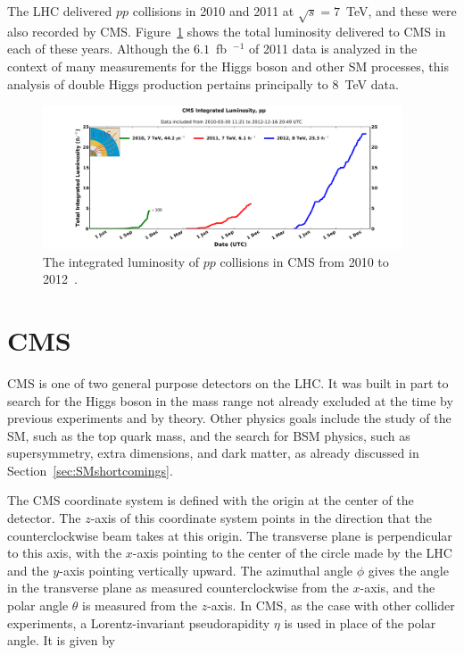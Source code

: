 The LHC delivered $pp$ collisions in 2010 and 2011 at $\sqrt{s} = 7$~TeV,
and these were also recorded by CMS.
Figure~\ref{fig:intlumi101112} shows the total luminosity delivered to CMS in each of these years.
Although the $6.1$~fb~$^{-1}$ of 2011 data is analyzed in the context of
many measurements for the Higgs boson and
other SM processes, this analysis of double Higgs production pertains principally to 8~TeV data.

\begin{figure}[htbp!]
 \begin{center}
    \includegraphics[width=0.95\textwidth]{figures/experiment/int_lumi_cumulative_pp_1.pdf}
      \end{center}
\caption{The integrated luminosity of $pp$ collisions in CMS from 2010 to 2012~\cite{CMS:lumi}.}
\label{fig:intlumi101112}
\end{figure}


\section{CMS\label{sec:CMS}}

CMS is one of two general purpose detectors on the LHC. It was built in part
to search for the Higgs boson in the mass range not already excluded
at the time by previous experiments
and by theory. Other physics goals include
the study of the SM, such as the top quark mass, and the search for BSM physics, such
as supersymmetry, extra dimensions, and dark matter, as already discussed in
Section~\ref{sec:SMshortcomings}.

The CMS coordinate system is defined with the origin at the center of the detector. The $z$-axis
of this coordinate system points in the direction that the counterclockwise beam takes at this origin.
The transverse plane is perpendicular to this axis, with the $x$-axis pointing to the center of the
circle made by the LHC and the $y$-axis pointing vertically upward. The azimuthal angle $\phi$ gives
the angle in the transverse plane as measured counterclockwise from the $x$-axis, and the polar angle
$\theta$ is measured from the $z$-axis. In CMS, as the case with other collider experiments,
a Lorentz-invariant pseudorapidity $\eta$ is used in place of the polar angle. It is given by

